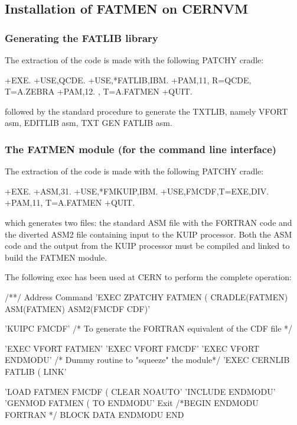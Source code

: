 \subsection{Installation of FATMEN on CERNVM}
\subsubsection{Generating the FATLIB library}
\par
The extraction of the code is made with the following PATCHY cradle:
\begin{XMP}
+EXE.
+USE,QCDE.
+USE,*FATLIB,IBM.
+PAM,11, R=QCDE, T=A.ZEBRA
+PAM,12.       , T=A.FATMEN
+QUIT.
\end{XMP}
followed by the standard procedure to generate the TXTLIB, namely
VFORT asm, EDITLIB asm, TXT GEN FATLIB asm.
\subsubsection{The FATMEN module (for the command line interface)}
\par
The extraction of the code is made with the following PATCHY cradle:
\begin{XMP}
+EXE.
+ASM,31.
+USE,*FMKUIP,IBM.
+USE,FMCDF,T=EXE,DIV.
+PAM,11, T=A.FATMEN
+QUIT.
\end{XMP}
which generates two files: the standard ASM file with the FORTRAN code
and the diverted ASM2 file containing input to the KUIP processor.
Both the ASM code and the output from the KUIP processor must be
compiled and linked to build the FATMEN module.
\par
The following exec has been used at CERN
to perform the complete operation:
\begin{XMP}
/**/
 Address Command
 'EXEC ZPATCHY FATMEN ( CRADLE(FATMEN) ASM(FATMEN) ASM2(FMCDF CDF)'
 
 'KUIPC FMCDF'  /* To generate the FORTRAN equivalent of the CDF file */
 
 'EXEC VFORT FATMEN'
 'EXEC VFORT FMCDF'
 'EXEC VFORT ENDMODU'         /* Dummy routine to "squeeze" the module*/
 'EXEC CERNLIB FATLIB ( LINK'
 
 'LOAD FATMEN FMCDF ( CLEAR NOAUTO'
 'INCLUDE ENDMODU'
 'GENMOD FATMEN ( TO ENDMODU'
 Exit
/*BEGIN ENDMODU FORTRAN */
      BLOCK DATA ENDMODU
      END
\end{XMP}
